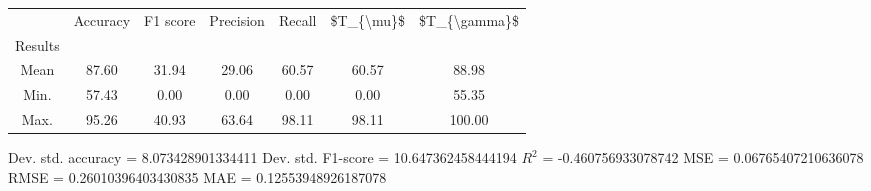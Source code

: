 \begin{tabular}{|c|c|c|c|c|c|c|}
\toprule
{} &  Accuracy &  F1 score &  Precision &  Recall &  \$T\_\{\textbackslash mu\}\$ &  \$T\_\{\textbackslash gamma\}\$ \\
Results &           &           &            &         &            &               \\
\hline
Mean    &     87.60 &     31.94 &      29.06 &   60.57 &      60.57 &         88.98 \\
Min.    &     57.43 &      0.00 &       0.00 &    0.00 &       0.00 &         55.35 \\
Max.    &     95.26 &     40.93 &      63.64 &   98.11 &      98.11 &        100.00 \\
\bottomrule
\end{tabular}

 Dev. std. accuracy = 8.073428901334411
 Dev. std. F1-score = 10.647362458444194
 $R^2$ = -0.460756933078742
 MSE = 0.06765407210636078
 RMSE = 0.26010396403430835
 MAE = 0.12553948926187078